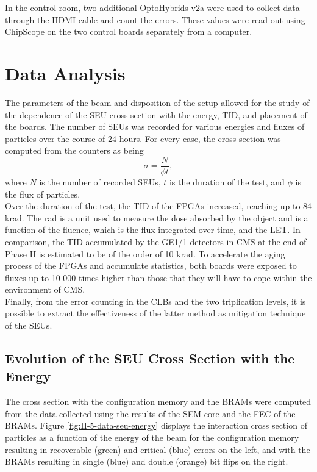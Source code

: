     In the control room, two additional OptoHybrids v2a were used to collect data through the HDMI cable and count the errors. These values were read out using ChipScope on the two control boards separately from a computer.

  \section{Data Analysis}

    The parameters of the beam and disposition of the setup allowed for the study of the dependence of the SEU cross section with the energy, TID, and placement of the boards. The number of SEUs was recorded for various energies and fluxes of particles over the course of 24 hours. For every case, the cross section was computed from the counters as being
    \begin{equation}
        \sigma = \frac{N}{\phi t} ,
    \end{equation}
    where $ N $ is the number of recorded SEUs, $ t $ is the duration of the test, and $ \phi $ is the flux of particles. \\

    Over the duration of the test, the TID of the FPGAs increased, reaching up to 84 krad. The rad is a unit used to measure the dose absorbed by the object and is a function of the fluence, which is the flux integrated over time, and the LET. In comparison, the TID accumulated by the GE1/1 detectors in CMS at the end of Phase II is estimated to be of the order of 10 krad. To accelerate the aging process of the FPGAs and accumulate statistics, both boards were exposed to fluxes up to 10 000 times higher than those that they will have to cope within the environment of CMS. \\

    Finally, from the error counting in the CLBs and the two triplication levels, it is possible to extract the effectiveness of the latter method as mitigation technique of the SEUs.

    \subsection{Evolution of the SEU Cross Section with the Energy}

      The cross section with the configuration memory and the BRAMs were computed from the data collected using the results of the SEM core and the FEC of the BRAMs. Figure \ref{fig:II-5-data-seu-energy} displays the interaction cross section of particles as a function of the energy of the beam for the configuration memory resulting in recoverable (green) and critical (blue) errors on the left, and with the BRAMs resulting in single (blue) and double (orange) bit flips on the right. \\

